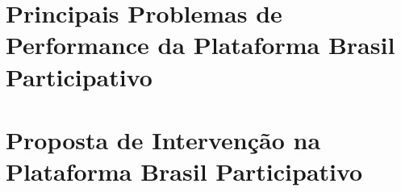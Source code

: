 \section{Principais Problemas de Performance da Plataforma Brasil Participativo}
\label{sec:principais_problemas_de_performance_da_plataforma_brasil_participativo}

\section{Proposta de Intervenção na Plataforma Brasil Participativo}
\label{sec:proposta_de_intervencao_na_plataforma_brasil_participativo}
